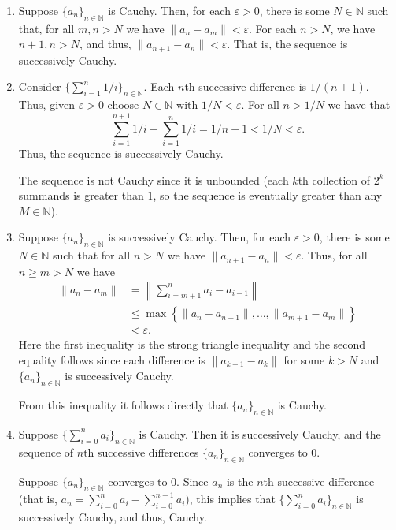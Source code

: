 \documentclass[12 pt, letterpaper]{hmcpset}
\begin{document}
\begin{solution}
	\begin{enumerate}
		\item Suppose $\{ a_{n} \}_{n \in \mathbb{N}}$ is Cauchy. Then, for each $\varepsilon > 0$, there is some $N \in \mathbb{N}$ such that, for all $m, n > N$ we have $\lVert a_{n} - a_{m} \rVert < \varepsilon$. For each $n > N$, we have $n + 1, n > N$, and thus,  $\lVert a_{n + 1} - a_{n} \rVert < \varepsilon$. That is, the sequence is successively Cauchy.

		\item Consider $\{ \sum_{i = 1}^{n} 1 / i \}_{n \in \mathbb{N}}$. Each $n$th successive difference is $1 / (n + 1)$. Thus, given $\varepsilon > 0$ choose $N \in \mathbb{N}$ with $1 / N < \varepsilon$. For all $n > 1 / N$ we have that
			\[
				\sum_{i = 1}^{n + 1} 1/ i - \sum_{i = 1}^{n} 1 / i = 1 / n + 1 < 1 / N < \varepsilon.
			\]
			Thus, the sequence is successively Cauchy.

			The sequence is not Cauchy since it is unbounded (each $k$th collection of $2^{k}$ summands is greater than $1$, so the sequence is eventually greater than any $M \in \mathbb{N}$).

		\item Suppose $\{ a_{n} \}_{n \in \mathbb{N}}$ is successively Cauchy. Then, for each $\varepsilon > 0$, there is some $N \in \mathbb{N}$ such that for all $n > N$ we have $\lVert a_{n + 1} - a_{n} \rVert < \varepsilon$. Thus, for all $n \ge m > N$ we have
			\begin{align*}
				\lVert a_{n} - a_{m} \rVert & = \left \lVert \sum_{i = m + 1}^{n} a_{i} - a_{i - 1}  \right \rVert \\
							    & \le \max \left \{ \lVert a_{n} - a_{n - 1} \rVert, \dots, \lVert a_{m + 1} - a_{m} \rVert \right \} \\
							    & < \varepsilon.
			\end{align*}
			Here the first inequality is the strong triangle inequality and the second equality follows since each difference is $\lVert a_{k + 1} - a_{k} \rVert$ for some $k > N$ and $\{ a_{n} \}_{n \in \mathbb{N}}$ is successively Cauchy.

			From this inequality it follows directly that $\{ a_{n} \}_{n \in \mathbb{N}}$ is Cauchy.
		\item Suppose $\{ \sum_{i = 0}^{n} a_{i} \}_{n \in \mathbb{N}}$ is Cauchy. Then it is successively Cauchy, and the sequence of $n$th successive differences $\{ a_{n} \}_{n \in \mathbb{N}}$ converges to $0$.

			Suppose $\{ a_{n} \}_{n \in \mathbb{N}}$ converges to $0$. Since $a_{n}$ is the $n$th successive difference (that is, $a_{n} = \sum_{i = 0}^{n} a_{i} - \sum_{i = 0}^{n - 1} a_{i}$), this implies that $\{ \sum_{i = 0}^{n} a_{i} \}_{n \in \mathbb{N}}$ is successively Cauchy, and thus, Cauchy.
	\end{enumerate}
\end{solution}
\end{document}
